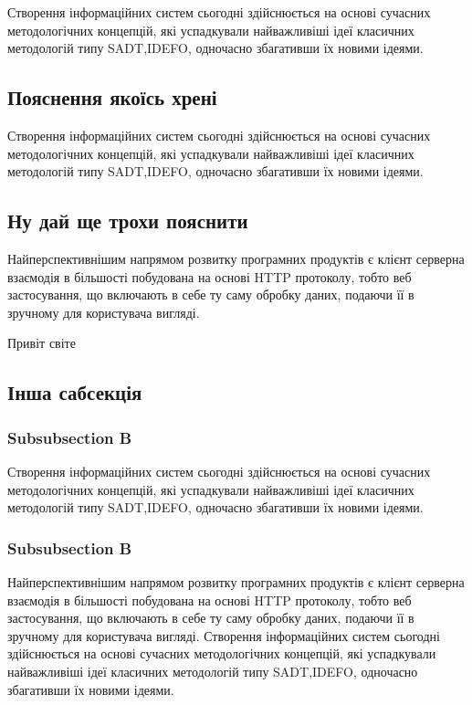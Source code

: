 \documentclass{lib/styles/default-style}
\begin{document}
\pagestyle{default-numbered}

\tableofcontents

\newpage


Створення  інформаційних  систем  сьогодні  здійснюється  
на  основі сучасних  методологічних  концепцій,
які  успадкували  найважливіші  ідеї класичних методологій типу
SADT,IDEFO, одночасно збагативши їх новими ідеями.

\subsection{Пояснення якоїсь хрені}

Створення  інформаційних  систем  сьогодні  здійснюється  
на  основі сучасних  методологічних  концепцій,
які  успадкували  найважливіші  ідеї класичних методологій типу
SADT,IDEFO, одночасно збагативши їх новими ідеями.
\subsection{Ну дай ще трохи пояснити}
Найперспективнішим напрямом розвитку програмних
продуктів є клієнт серверна взаємодія в більшості
побудована на основі HTTP протоколу, тобто веб застосування,
що включають в себе ту саму обробку даних, подаючи її
в зручному для користувача вигляді.

Привіт світе

\newpage
{}
\subsection{Інша сабсекція}
\subsubsection{Subsubsection B}
Створення  інформаційних  систем  сьогодні  здійснюється  
на  основі сучасних  методологічних  концепцій,
які  успадкували  найважливіші  ідеї класичних методологій типу
SADT,IDEFO, одночасно збагативши їх новими ідеями.


\subsubsection{Subsubsection B}
Найперспективнішим напрямом розвитку програмних
продуктів є клієнт серверна взаємодія в більшості
побудована на основі HTTP протоколу, тобто веб застосування,
що включають в себе ту саму обробку даних, подаючи її
в зручному для користувача вигляді.
Створення  інформаційних  систем  сьогодні  здійснюється  
на  основі сучасних  методологічних  концепцій,
які  успадкували  найважливіші  ідеї класичних методологій типу
SADT,IDEFO, одночасно збагативши їх новими ідеями.
\end{document}
